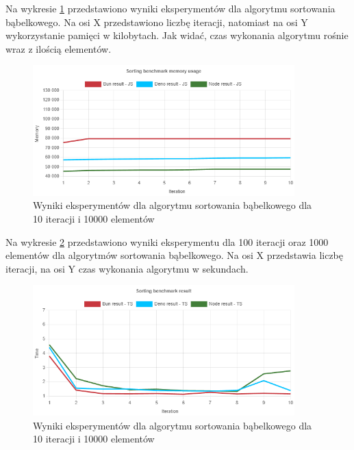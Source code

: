 Na wykresie \ref{fig:bubble_sorting_e4_memory_js} przedstawiono wyniki eksperymentów dla algorytmu sortowania bąbelkowego. Na osi X przedstawiono liczbę iteracji, natomiast na osi Y wykorzystanie pamięci w kilobytach. Jak widać, czas wykonania algorytmu rośnie wraz z ilością elementów.
\begin{figure}[H]
  \centering
  \includegraphics[width=0.9\textwidth]{Figures/sorting/bubble/e4_memory_js.png}
  \caption{Wyniki eksperymentów dla algorytmu sortowania bąbelkowego dla 10 iteracji i 10000 elementów}
  \label{fig:bubble_sorting_e4_memory_js}
\end{figure}

Na wykresie \ref{fig:bubble_sorting_e4_ts} przedstawiono wyniki eksperymentu dla 100 iteracji oraz 1000 elementów dla algorytmów sortowania bąbelkowego. Na osi X przedstawia liczbę iteracji, na osi Y czas wykonania algorytmu w sekundach. 

\begin{figure}[H]
  \centering
  \includegraphics[width=0.9\textwidth]{Figures/sorting/bubble/e4_ts.png}
  \caption{Wyniki eksperymentów dla algorytmu sortowania bąbelkowego dla 10 iteracji i 10000 elementów}
  \label{fig:bubble_sorting_e4_ts}
\end{figure}

